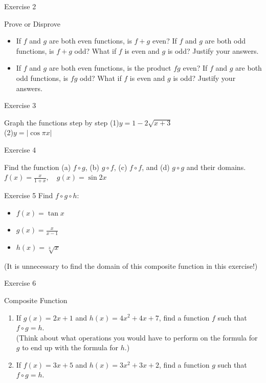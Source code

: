 \documentclass{beamer}
\begin{document}
\begin{frame}{Exercise 2}
    \begin{block}{Prove or Disprove}
        \begin{itemize}
            \item If $f$ and $g$ are both even functions, is $f+g$ even? If $f$ and $g$ are both odd functions, is $f+g$ odd? What if $f$ is even and $g$ is odd? Justify your answers.
            \item If $f$ and $g$ are both even functions, is the product $f g$ even? If $f$ and $g$ are both odd functions, is $f g$ odd? What if $f$ is even and $g$ is odd? Justify your answers.
        \end{itemize}
    \end{block}
\end{frame}

\begin{frame}{Exercise 3}
    \begin{block}{Graph the functions step by step}
    (1)$y=1-2 \sqrt{x+3}$\\
    (2)$y=|\cos \pi x|$
    \end{block}
\end{frame}


\begin{frame}{Exercise 4}
    \begin{block}{Find the function (a) $f \circ g$, (b) $g \circ f$, (c) $f \circ f$, and (d) $g \circ g$ and their domains.}
    $f(x)=\frac{x}{1+x}, \quad g(x)=\sin 2 x$\\
    \end{block}
\end{frame}

\begin{frame}{Exercise 5}
    Find $f \circ g\circ h$:\\
\begin{itemize}
    \item $f(x)=\tan x$
 \item $g(x)=\frac{x}{x-1}$
\item $h(x)=\sqrt[3]{x}$
\end{itemize}
(It is unnecessary to find the domain of this composite function in this exercise!)
\end{frame}

\begin{frame}{Exercise 6}
    \begin{block}{Composite Function}
\begin{enumerate}
    \item If $g(x)=2 x+1$ and $h(x)=4 x^{2}+4 x+7$, find a function $f$ such that $f \circ g=h$. \\(Think about what operations you would have to perform on the formula for $g$ to end up with the formula for $h$.)\\
\item If $f(x)=3 x+5$ and $h(x)=3 x^{2}+3 x+2$, find a function $g$ such that $f \circ g=h$.\\
\end{enumerate}
    \end{block}
\end{frame}
\end{document}
